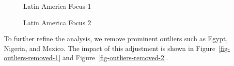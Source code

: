\documentclass[
  11pt,
]{article}
\begin{document}
\begin{figure}[H]


\caption{\label{fig-latam-focus-1}Latin America Focus 1}

\end{figure}%

\begin{figure}[H]


\caption{\label{fig-latam-focus-2}Latin America Focus 2}

\end{figure}%

To further refine the analysis, we remove prominent outliers such as
Egypt, Nigeria, and Mexico. The impact of this adjustment is shown in
Figure~\ref{fig-outliers-removed-1} and
Figure~\ref{fig-outliers-removed-2}.
\end{document}
